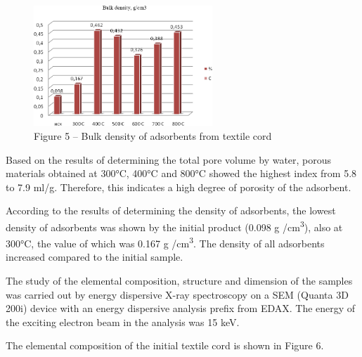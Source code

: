 \begin{figure}[H]
	\centering
	\includegraphics[width=0.6\textwidth]{assets/1008}
	\caption*{Figure 5 -- Bulk density of adsorbents from textile cord}
\end{figure}

\begin{multicols}{2}
Based on the results of determining the total pore volume by water,
porous materials obtained at 300°C, 400°C and 800°C showed the highest
index from 5.8 to 7.9 ml/g. Therefore, this indicates a high degree of
porosity of the adsorbent.

According to the results of determining the density of adsorbents, the
lowest density of adsorbents was shown by the initial product (0.098 g
/cm\textsuperscript{3}), also at 300°C, the value of which was 0.167 g
/cm\textsuperscript{3}. The density of all adsorbents increased compared
to the initial sample.

The study of the elemental composition, structure and dimension of the
samples was carried out by energy dispersive X-ray spectroscopy on a SEM
(Quanta 3D 200i) device with an energy dispersive analysis prefix from
EDAX. The energy of the exciting electron beam in the analysis was 15
keV.

The elemental composition of the initial textile cord is shown in Figure
6.
\end{multicols}

